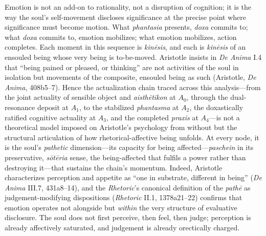 \documentclass{article}
\begin{document}
Emotion is not an add-on to rationality, not a disruption of cognition; it is the way the soul's self-movement discloses significance at the precise point where significance must become motion. What \textit{phantasia} presents, \textit{doxa} commits to; what \textit{doxa} commits to, emotion mobilizes; what emotion mobilizes, action completes. Each moment in this sequence is \textit{kinēsis}, and each is \textit{kinēsis} of an ensouled being whose very being is to-be-moved. Aristotle insists in \textit{De Anima} I.4 that ``being pained or pleased, or thinking'' are not activities of the soul in isolation but movements of the composite, ensouled being as such (Aristotle, \textit{De Anima}, 408b5--7). Hence the actualization chain traced across this analysis---from the joint actuality of sensible object and \textit{aisthētikon} at $A_0$, through the dual-resonance deposit at $A_1$, to the stabilized \textit{phantasma} at $A_2$, the doxastically ratified cognitive actuality at $A_3$, and the completed \textit{praxis} at $A_4$---is not a theoretical model imposed on Aristotle's psychology from without but the structural articulation of how rhetorical-affective being unfolds. At every node, it is the soul's \textit{pathetic} dimension---its capacity for being affected---\textit{paschein} in its preservative, \textit{sōtēria} sense, the being-affected that fulfils a power rather than destroying it---that sustains the chain's momentum. Indeed, Aristotle characterizes perception and appetite as ``one in substrate, different in being'' (\textit{De Anima} III.7, 431a8--14), and the \textit{Rhetoric}'s canonical definition of the \textit{pathē} as judgement-modifying dispositions (\textit{Rhetoric} II.1, 1378a21--22) confirms that emotion operates not alongside but \textit{within} the very structure of evaluative disclosure. The soul does not first perceive, then feel, then judge; perception is already affectively saturated, and judgement is already orectically charged.
\end{document}
